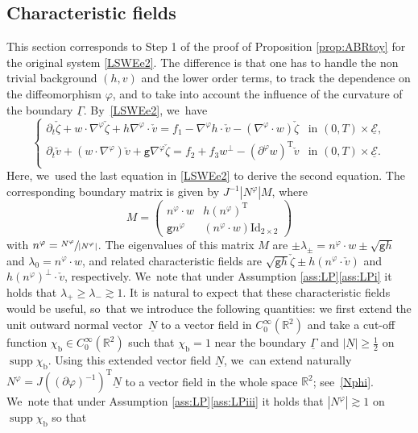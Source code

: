 \documentclass[11pt]{article}
\newcommand{\gr}{{\mathtt g}}
\newcommand{\R}{{\mathbb R}}
\newcommand{\dt}{\partial_t}
\newcommand{\cE}{{\mathcal E}}
\newcommand{\ul}[1]{\underline{#1}}
\newcommand{\itGamma}{\mathit{\Gamma}}
\theoremstyle{definition}
\begin{document}
\subsection{Characteristic fields}
This section corresponds to Step 1 of the proof of Proposition \ref{prop:ABRtoy} for the original system \eqref{LSWEe2}.
The difference is that one has to handle the non trivial background $(h,v)$ and the lower order terms, to track the dependence on the diffeomorphism $\varphi$,
and to take into account the influence of the curvature of the boundary $\ul{\itGamma}$. By~\eqref{LSWEe2}, we~have
\begin{equation}\label{LSWEe5}
\begin{cases}
\dt\check{\zeta}+w\cdot\nabla^\varphi\check{\zeta}+h\nabla^\varphi\cdot\check{v} = f_1-\nabla^\varphi h\cdot\check{v}-(\nabla^\varphi\cdot w)\check{\zeta}
&\text{in } (0,T)\times\ul{\cE}, \\
\dt\check{v}+(w\cdot\nabla^\varphi)\check{v}+\gr\nabla^\varphi\check{\zeta} = f_2 + f_3w^\perp-(\partial^\varphi w)^\mathrm{T}\check{v}
&\text{in } (0,T)\times\ul{\cE}. \\
\end{cases}
\end{equation}
Here, we~used the last equation in \eqref{LSWEe2} to derive the second equation.
The corresponding boundary matrix is given by $J^{-1}|N^\varphi| M$, where
\[
M =
\begin{pmatrix}
n^\varphi\cdot w & h(n^\varphi)^\mathrm{T} \\
\gr n^\varphi & (n^\varphi\cdot w)\mathrm{Id}_{2\times2}
\end{pmatrix}
\]
with $n^\varphi = \sfrac{N^\varphi}{|N^\varphi|}$.
The eigenvalues of this matrix $M$ are $\pm\lambda_{\pm}=n^\varphi\cdot w \pm \sqrt{\gr h}$ and $\lambda_0=n^\varphi\cdot w$, and related characteristic fields are
$\sqrt{\gr h}\check{\zeta}\pm h(n^\varphi\cdot\check{v})$ and $h(n^\varphi)^\perp\cdot\check{v}$, respectively. We~note that under Assumption \ref{ass:LP}\eqref{ass:LPi} it holds that $\lambda_+\geq\lambda_-\gtrsim1$.
It is natural to expect that these characteristic fields would be useful, so~that we introduce the following quantities:
we first extend the unit outward normal vector~$\ul{N}$ to a vector field in $C_0^\infty(\R^2)$ and take a cut-off function $\chi_\mathrm{b}\in C_0^\infty(\R^2)$
such that $\chi_\mathrm{b}=1$ near the boundary $\ul{\itGamma}$ and $|\ul{N}|\geq\frac12$ on $\operatorname{supp}\chi_\mathrm{b}$.
Using this extended vector field $\ul{N}$, we~can extend naturally $N^\varphi=J((\partial\varphi)^{-1})^\mathrm{T}\ul{N}$ to a vector field in the whole space $\R^2$; see~\eqref{Nphi}. We~note that under Assumption \ref{ass:LP}\eqref{ass:LPiii} it holds that $|N^\varphi| \gtrsim 1$ on $\operatorname{supp}\chi_\mathrm{b}$ so that
\end{document}
